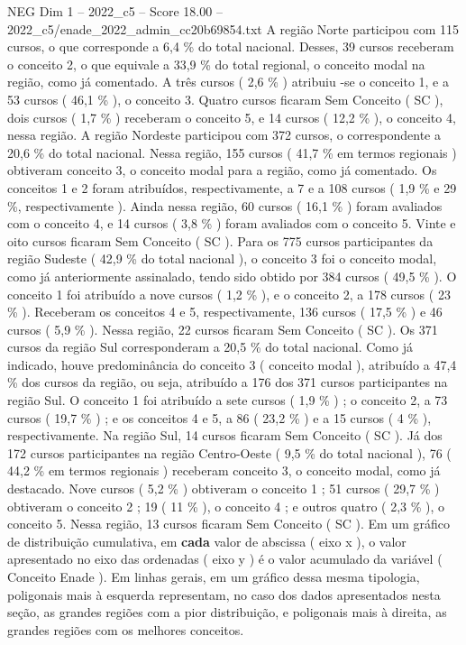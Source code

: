 \begin{textsample}{NEG Dim 1 – 2022\_c5 – Score 18.00 – 2022\_c5/enade\_2022\_admin\_cc20b69854.txt}
A região Norte participou com 115 cursos, o que corresponde a 6,4 \% do total nacional.
Desses, 39 cursos receberam o conceito 2, o que equivale a 33,9 \% do total regional, o conceito modal na região, como já comentado.
A três cursos ( 2,6 \% ) atribuiu -se o conceito 1, e a 53 cursos ( 46,1 \% ), o conceito 3.
Quatro cursos ficaram Sem Conceito ( SC ), dois cursos ( 1,7 \% ) receberam o conceito 5, e 14 cursos ( 12,2 \% ), o conceito 4, nessa região.
A região Nordeste participou com 372 cursos, o correspondente a 20,6 \% do total nacional.
Nessa região, 155 cursos ( 41,7 \% em termos regionais ) obtiveram conceito 3, o conceito modal para a região, como já comentado.
Os conceitos 1 e 2 foram atribuídos, respectivamente, a 7 e a 108 cursos ( 1,9 \% e 29 \%, respectivamente ).
Ainda nessa região, 60 cursos ( 16,1 \% ) foram avaliados com o conceito 4, e 14 cursos ( 3,8 \% ) foram avaliados com o conceito 5.
Vinte e oito cursos ficaram Sem Conceito ( SC ).
Para os 775 cursos participantes da região Sudeste ( 42,9 \% do total nacional ), o conceito 3 foi o conceito modal, como já anteriormente assinalado, tendo sido obtido por 384 cursos ( 49,5 \% ).
O conceito 1 foi atribuído a nove cursos ( 1,2 \% ), e o conceito 2, a 178 cursos ( 23 \% ).
Receberam os conceitos 4 e 5, respectivamente, 136 cursos ( 17,5 \% ) e 46 cursos ( 5,9 \% ).
Nessa região, 22 cursos ficaram Sem Conceito ( SC ).
Os 371 cursos da região Sul corresponderam a 20,5 \% do total nacional.
Como já indicado, houve predominância do conceito 3 ( conceito modal ), atribuído a 47,4 \% dos cursos da região, ou seja, atribuído a 176 dos 371 cursos participantes na região Sul.
O conceito 1 foi atribuído a sete cursos ( 1,9 \% ) ; o conceito 2, a 73 cursos ( 19,7 \% ) ; e os conceitos 4 e 5, a 86 ( 23,2 \% ) e a 15 cursos ( 4 \% ), respectivamente.
Na região Sul, 14 cursos ficaram Sem Conceito ( SC ).
Já dos 172 cursos participantes na região Centro-Oeste ( 9,5 \% do total nacional ), 76 ( 44,2 \% em termos regionais ) receberam conceito 3, o conceito modal, como já destacado.
Nove cursos ( 5,2 \% ) obtiveram o conceito 1 ; 51 cursos ( 29,7 \% ) obtiveram o conceito 2 ; 19 ( 11 \% ), o conceito 4 ; e outros quatro ( 2,3 \% ), o conceito 5.
Nessa região, 13 cursos ficaram Sem Conceito ( SC ).
Em um gráfico de distribuição cumulativa, em \textbf{cada} valor de abscissa ( eixo x ), o valor apresentado no eixo das ordenadas ( eixo y ) é o valor acumulado da variável ( Conceito Enade ).
Em linhas gerais, em um gráfico dessa mesma tipologia, poligonais mais à esquerda representam, no caso dos dados apresentados nesta seção, as grandes regiões com a pior distribuição, e poligonais mais à direita, as grandes regiões com os melhores conceitos.

\end{textsample}

